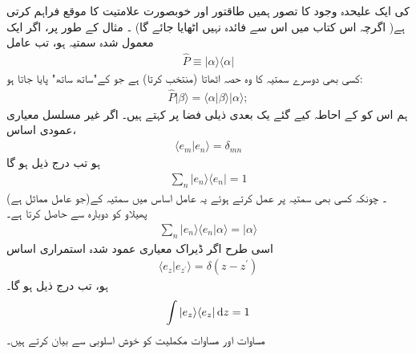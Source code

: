  کی ایک علیحدہ وجود کا تصور ہمیں طاقتور اور خوبصورت علامتیت کا موقع فراہم کرتی ہے( اگرچہ اس کتاب میں اس سے فائدہ نہیں اٹھایا جائے گا) ۔ مثال کے طور پر، اگر  ایک معمول شدہ سمتیہ ہو، تب عامل 
\begin{align}
\hat{P} \equiv | \alpha \rangle \langle \alpha | 
\end{align}
کسی بھی دوسرے سمتیہ کا وہ حصہ اٹھاتا (منتخب کرتا) ہے جو  کے"ساتھ ساتھ" پایا جاتا ہو:
\begin{align*}
\hat{P} | \beta \rangle = \langle \alpha | \beta \rangle | \alpha \rangle ;
\end{align*}
ہم اس کو  کے احاطہ کیے گئے یک بعدی ذیلی فضا پر  کہتے ہیں۔ اگر  غیر مسلسل معیاری عمودی اساس،
\begin{align}
\langle e_{m} | e_{n} \rangle = \delta_{mn}
\end{align}
ہو تب درج ذیل ہو گا 
\begin{align}\label{مساوات_قواعد_مکملیت_الف}
\sum_{n} | e_{n} \rangle \langle e_{n} | = 1 
\end{align}
(جو عامل مماثل ہے)۔ چونکہ کسی بھی سمتیہ  پر عمل کرتے ہوئے یہ عامل اساس میں سمتیہ  کے پھیلاو کو دوبارہ سے حاصل کرتا ہے۔ 
\begin{align}
\sum_{n} | e_{n} \rangle \langle e_{n} | \alpha \rangle = | \alpha \rangle 
\end{align}
اسی طرح اگر  ڈیراک معیاری عمود شدہ استمراری اساس 
\begin{align}
\langle e_{z} | e_{z^{'}} \rangle = \delta ( z-z^{'})
\end{align}
ہو، تب درج ذیل ہو گا۔ 
\begin{align}\label{مساوات_قواعد_مکملیت_ب}
\int | e_{z} \rangle \langle e_{z} | \dif z = 1
\end{align}
 مساوات  اور مساوات  مکملیت کو خوش اسلوبی سے بیان کرتے ہیں۔
 
